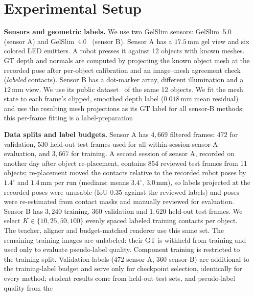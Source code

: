 \section{Experimental Setup}
\label{sec:setup}

\noindent\textbf{Sensors and geometric labels.} We use two GelSlim sensors: GelSlim~5.0~\cite{wang2026gelslim} (sensor A) and GelSlim~4.0~\cite{sipos2024gelslim4} (sensor B). Sensor A has a $17.5\,$mm gel view and six colored LED emitters. A robot presses it against 12 objects with known meshes. GT depth and normals are computed by projecting the known object mesh at the recorded pose after per-object calibration and an image--mesh agreement check (\emph{labeled} contacts). Sensor B has a dot-marker array, different illumination and a $12\,$mm view. We use its public dataset~\cite{sipos2024gelslim4} of the same 12 objects. We fit the mesh state to each frame's clipped, smoothed depth label ($0.018\,$mm mean residual) and use the resulting mesh projections as its GT label for all sensor-B methods; this per-frame fitting is a label-preparation 

\noindent\textbf{Data splits and label budgets.} Sensor A has $4{,}669$ filtered frames: $472$ for validation, $530$ held-out test frames used for all within-session sensor-A evaluation, and $3{,}667$ for training. A second session of sensor A, recorded on another day after object re-placement, contains $854$ reviewed test frames from 11 objects; re-placement moved the contacts relative to the recorded robot poses by $1.4^\circ$ and $1.4\,$mm per run (medians; means $3.4^\circ$, $3.0\,$mm), so labels projected at the recorded poses were unusable (IoU $0.35$ against the reviewed labels) and poses were re-estimated from contact masks and manually reviewed for evaluation. Sensor B has $3{,}240$ training, $360$ validation and $1{,}620$ held-out test frames. We select $K\in\{10,25,50,100\}$ evenly spaced labeled training contacts per object. The teacher, aligner and budget-matched renderer use this same set. The remaining training images are unlabeled: their GT is withheld from training and used only to evaluate pseudo-label quality. Component training is restricted to the training split. Validation labels ($472$ sensor-A, $360$ sensor-B) are additional to the training-label budget and serve only for checkpoint selection, identically for every method; student results come from held-out test sets, and pseudo-label quality from the 

